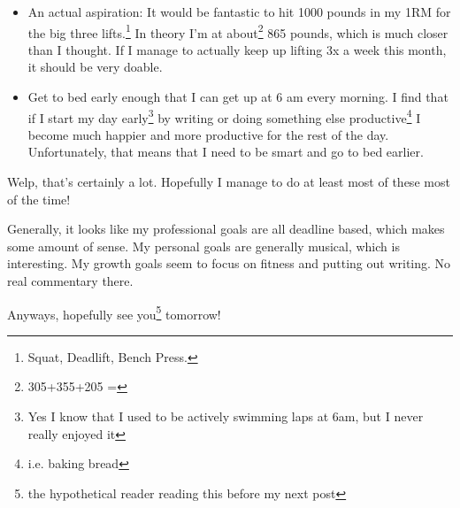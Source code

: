 \documentclass[12pt]{article}[titlepage]
\renewcommand{\,}{\textsuperscript{,}}
\begin{document}
\begin{enumerate}
\begin{itemize}
\item An actual aspiration: It would be fantastic to hit 1000 pounds in my 1RM for the big three lifts.\footnote{Squat, Deadlift, Bench Press.}
In theory I'm at about\footnote{305+355+205 =} 865 pounds, which is much closer than I thought. If I manage to actually keep up lifting 3x a week this month, it should be very doable.
\item Get to bed early enough that I can get up at 6 am every morning. I find that if I start my day early\footnote{Yes I know that I used to be actively swimming laps at 6am, but I never really enjoyed it} by writing or doing something else productive\footnote{i.e. baking bread} I become much happier and more productive for the rest of the day.
Unfortunately, that means that I need to be smart and go to bed earlier.
\end{itemize}
\end{enumerate}
Welp, that's certainly a lot.
Hopefully I manage to do at least most of these most of the time!

Generally, it looks like my professional goals are all deadline based, which makes some amount of sense.
My personal goals are generally musical, which is interesting.
My growth goals seem to focus on fitness and putting out writing.
No real commentary there.

Anyways, hopefully see you\footnote{the hypothetical reader reading this before my next post} tomorrow!
\end{document}
